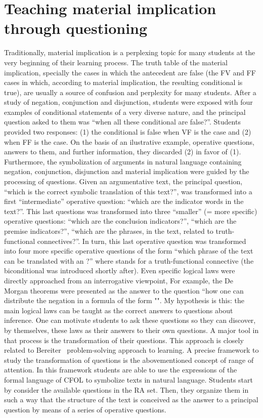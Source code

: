 \documentclass[a4paper,UKenglish]{lipics}
\begin{document}
\section{Teaching material implication through questioning}

Traditionally, material implication is a perplexing topic for many students at the very beginning of their learning process. The truth table of the material implication, specially the cases in which the antecedent are false (the FV and FF cases in which, according to material implication, the resulting conditional is true), are usually a source of confusion and perplexity for many students. After a study of negation, conjunction and disjunction, students were exposed with four examples of  conditional statements of a very diverse nature, and the principal question asked to them was “when all these conditional are false?”. Students provided two responses: (1) the conditional is false when VF is the case and (2) when FF is the case. On the basis of an ilustrative example, operative questions, answers to them, and further information, they discarded (2) in favor of (1). Furthermore, the symbolization of arguments in natural language containing negation, conjunction, disjunction and material implication were guided by the processing of questions. Given an argumentative text, the principal question, “which is the correct symbolic translation of this text?”, was transformed into a first “intermediate” operative question: “which are the indicator words in the text?”. This last questions was transformed into three “smaller” (= more specific) operative questions: “which are the conclusion indicators?”, “which are the premise indicators?”, “which are the phrases, in the text, related to truth-functional connectives?”. In turn, this last operative question was transformed into four more specific operative questions of the form “which phrase of the text can be translated with an ?” where  stands for a truth-functional connective (the biconditional was introduced shortly after).
Even specific logical laws were directly approached from an interrogative viewpoint, For example, the De Morgan theorems were presented as the answer to the question “how one can distribute the negation in a formula of the form "". My hypothesis is this: the main logical laws can be taught as the correct answers to questions about inference. One can motivate students to ask these questions so they can discover, by themselves, these laws as their answers to their own questions. A major tool in that process is the transformation of their questions. This approach is closely related to Bereiter~\cite{Bereiter} problem-solving approach to learning. 
A precise framework to study the transformation of questions is the abovementioned concept of range of attention. In this framework students are able to use the expressions of the formal language of CFOL to symbolize texts in natural language. Students start by consider the available questions in the RA set. Then, they organize them in such a way that the structure of the text is conceived as the answer to a principal question by means of a series of operative questions.
\end{document}
